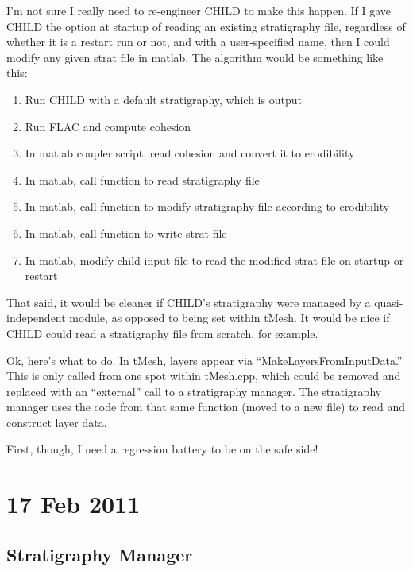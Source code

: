 \documentclass[12pt]{amsart}
\begin{document}
I'm not sure I really need to re-engineer CHILD to make this happen. If I gave CHILD the option at startup of reading an existing stratigraphy file, regardless of whether it is a restart run or not, and with a user-specified name, then I could modify any given strat file in matlab.
The algorithm would be something like this:
\begin{enumerate}
  \item Run CHILD with a default stratigraphy, which is output
  \item Run FLAC and compute cohesion
  \item In matlab coupler script, read cohesion and convert it to erodibility
  \item In matlab, call function to read stratigraphy file
  \item In matlab, call function to modify stratigraphy file according to erodibility
  \item In matlab, call function to write strat file
  \item In matlab, modify child input file to read the modified strat file on startup or restart
\end{enumerate}

That said, it would be cleaner if CHILD's stratigraphy were managed by a quasi-independent module, as opposed to being set within tMesh. It would be nice if CHILD could read a stratigraphy file from scratch, for example. 

Ok, here's what to do. In tMesh, layers appear via ``MakeLayersFromInputData.'' This is only called from one spot within tMesh.cpp, which could be removed and replaced with an ``external'' call to a stratigraphy manager. The stratigraphy manager uses the code from that same function (moved to a new file) to read and construct layer data.

First, though, I need a regression battery to be on the safe side!

\section{17 Feb 2011}
\subsection{Stratigraphy Manager}
\end{document}
